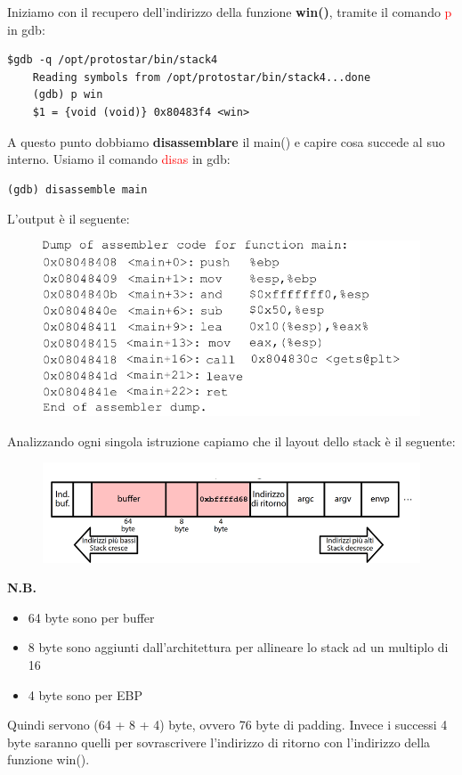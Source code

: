 Iniziamo con il recupero dell'indirizzo della funzione \textbf{win()}, tramite il comando \textcolor{red}{p} in gdb:
\begin{lstlisting}[style=bashstyle]
    $gdb -q /opt/protostar/bin/stack4
    Reading symbols from /opt/protostar/bin/stack4...done
    (gdb) p win 
    $1 = {void (void)} 0x80483f4 <win>
\end{lstlisting}

A questo punto dobbiamo \textbf{disassemblare} il main() e capire cosa succede al suo interno. Usiamo il comando \textcolor{red}{disas} in gdb:
\begin{lstlisting}[style=bashstyle]
    (gdb) disassemble main
\end{lstlisting}
L'output è il seguente:
\begin{figure}[ht]
    \includegraphics[width=\textwidth]{Capitolo 3/Figure/disas-main-stack4.png}
\end{figure}

Analizzando ogni singola istruzione capiamo che il layout dello stack è il seguente:
\begin{figure}[ht]
    \includegraphics[width=\textwidth]{Capitolo 3/Figure/layout-stack4.png}
\end{figure}
\clearpage
\textbf{N.B.}\begin{itemize}
    \item 64 byte sono per buffer
    \item 8 byte sono aggiunti dall'architettura per allineare lo stack ad un multiplo di 16
    \item 4 byte sono per EBP
\end{itemize}
Quindi servono (64 + 8 + 4) byte, ovvero 76 byte di padding. Invece i successi 4 byte saranno quelli per sovrascrivere l'indirizzo di ritorno con l'indirizzo della funzione win().

